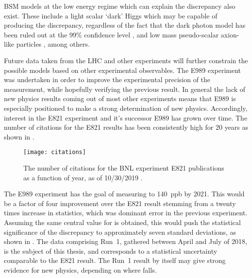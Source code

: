 BSM models at the low energy regime which can explain the discrepancy also exist. These include a light scalar `dark' Higgs which may be capable of producing the discrepancy, regardless of the fact that the dark photon model has been ruled out at the 99\% confidence level \cite{Chen:2015vqy,Ablikim:2017aab}, and low mass pseudo-scalar axion-like particles \cite{Marciano_2016}, among others.



Future data taken from the LHC and other experiments will further constrain the possible models based on other experimental observables. The E989 experiment was undertaken in order to improve the experimental precision of the \amu measurement, while hopefully verifying the previous result. In general the lack of new physics results coming out of most other experiments means that E989 is especially positioned to make a strong determination of new physics. Accordingly, interest in the E821 experiment and it's successor E989 has grown over time. The number of citations for the E821 results has been consistently high for 20 years as shown in .



\begin{figure}
	\centering
	\texttt{[image: citations]}
	\caption[Citations for E821 publications vs year]{The number of citations for the BNL experiment E821 publications as a function of year, as of 10/30/2019 \cite{MarkComm}.}
	\label{fig:E821Citations}
\end{figure}


The E989 experiment has the goal of measuring \amu to \SI{140}{ppb} by 2021. This would be a factor of four improvement over the E821 result stemming from a twenty times increase in statistics, which was dominant error in the previous experiment. Assuming the same central value for \amu is obtained, this would push the statistical significance of the discrepancy to approximately seven standard deviations, as shown in . The data comprising Run~1, gathered between April and July of 2018, is the subject of this thesis, and corresponds to a statistical uncertainty comparable to the E821 result. The Run~1 result by itself may give strong evidence for new physics, depending on where \amu falls.





